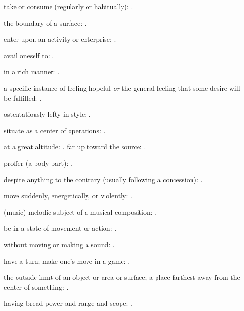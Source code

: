   take or consume (regularly or habitually):   .

  the boundary of a surface:   .

  enter upon an activity or enterprise:   .

  avail oneself to:   .

  in a rich manner:   .

  a specific instance of feeling hopeful \textit{or} the general feeling that some desire will be fulfilled: .

  ostentatiously lofty in style:   .

  situate as a center of operations: .

  at a great altitude:   . far up toward the source: .

  proffer (a body part): .

  despite anything to the contrary (usually following a concession):   .

  move suddenly, energetically, or violently: .

  (music) melodic subject of a musical composition:   .

  be in a state of movement or action:   .

  without moving or making a sound:   .

  have a turn; make one's move in a game:   .

  the outside limit of an object or area or surface; a place farthest away from the center of something: .

  having broad power and range and scope: .

